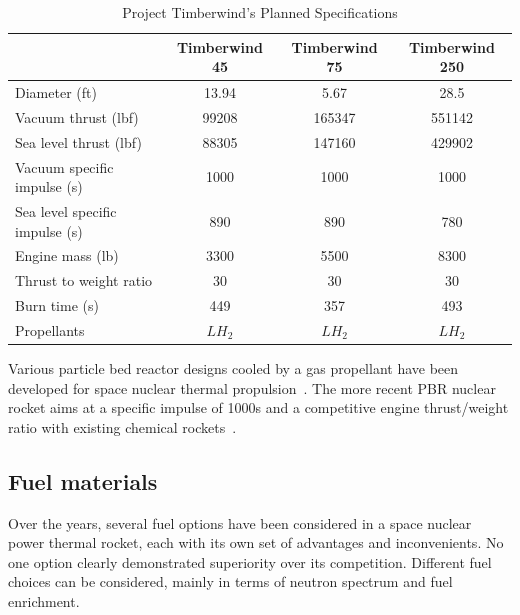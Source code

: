 \documentclass{article}
\begin{document}
\begin{table}[]
\centering
\caption{Project Timberwind's Planned Specifications}
\label{appO}
\begin{tabular}{|l|c|c|c|}
\hline
\multicolumn{1}{|c|}{}         & Timberwind 45 & Timberwind 75 & Timberwind 250 \\ \hline
Diameter (ft)                  & 13.94         & 5.67          & 28.5           \\ \hline
Vacuum thrust (lbf)            & 99208         & 165347        & 551142         \\ \hline
Sea level thrust (lbf)         & 88305         & 147160        & 429902         \\ \hline
Vacuum specific impulse (s)    & 1000          & 1000          & 1000           \\ \hline
Sea level specific impulse (s) & 890           & 890           & 780            \\ \hline
Engine mass (lb)               & 3300          & 5500          & 8300           \\ \hline
Thrust to weight ratio         & 30            & 30            & 30             \\ \hline
Burn time (s)                  & 449           & 357           & 493            \\ \hline
Propellants                    & $LH_2$        & $LH_2$        & $LH_2$         \\ \hline
\end{tabular}
\end{table}

Various particle bed reactor designs cooled by a gas propellant have been developed for space nuclear thermal propulsion~\cite{hatch1960fluidized,ludewig1974feasibility,powell1985high}. The more recent PBR nuclear rocket aims at a specific impulse of 1000s and a competitive engine thrust/weight ratio with existing chemical rockets~\cite{ludewig1996design}.


\subsection{Fuel materials}
\label{fuelmat}

Over the years, several fuel options have been considered in a space nuclear power thermal rocket, each with its own set of advantages and inconvenients. No one option clearly demonstrated superiority over its competition. Different fuel choices can be considered, mainly in terms of neutron spectrum and fuel enrichment.
\end{document}
